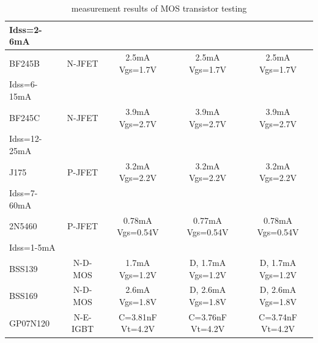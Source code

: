 \begin{table}[H]
\begin{center}
\begin{tabular}{| l | c | c | c | c |}
Idss=2-6mA   &         &                  &                  &              \\
    \hline
BF245B       & N-JFET  & 2.5mA Vgs=1.7V   & 2.5mA Vgs=1.7V   & 2.5mA Vgs=1.7V \\
Idss=6-15mA  &         &                  &                  &              \\
    \hline
BF245C       & N-JFET  & 3.9mA Vgs=2.7V   & 3.9mA Vgs=2.7V   & 3.9mA Vgs=2.7V \\
Idss=12-25mA &         &                  &                  &              \\
    \hline
J175        & P-JFET   & 3.2mA Vgs=2.2V   & 3.2mA Vgs=2.2V   & 3.2mA Vgs=2.2V \\
Idss=7-60mA &          &                  &                  &              \\
    \hline
2N5460      & P-JFET   & 0.78mA Vgs=0.54V & 0.77mA Vgs=0.54V & 0.78mA Vgs=0.54V \\
Idss=1-5mA  &          &                  &                  &              \\
    \hline
BSS139      & N-D-MOS  & 1.7mA Vgs=1.2V  & D, 1.7mA Vgs=1.2V & D, 1.7mA Vgs=1.2V \\
    \hline
BSS169      & N-D-MOS  & 2.6mA Vgs=1.8V  & D, 2.6mA Vgs=1.8V & D, 2.6mA Vgs=1.8V \\
    \hline
GP07N120    & N-E-IGBT & C=3.81nF Vt=4.2V & C=3.76nF Vt=4.2V & C=3.74nF Vt=4.2V \\
    \hline
    \end{tabular}
  \end{center}
  \caption{measurement results of MOS transistor testing}
  \label{tab:mos} 
\end{table}
